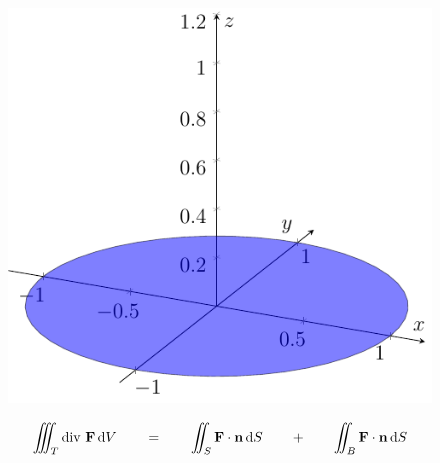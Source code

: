 \begin{frame}
\begin{figure}[ht]
\begin{minipage}[b]{0.30\linewidth}
        \end{minipage}
        \hspace{0.30cm}
        \begin{minipage}[b]{0.30\linewidth}
            \centering
            \includegraphics[width=\textwidth]{../img/2-Bunn.pdf}
        \end{minipage}
    \end{figure}
\begin{align*}
    \iiint_{T} \text{div }\mathbf{F} \mathop{}\! \mathrm{d} V\mathop{}\!
    \qquad =  \qquad
    \iint_{S} \mathbf{F} \cdot \mathbf{n} \mathop{}\! \mathrm{d} S\mathop{}\!
    \qquad + \qquad
    \iint_{B} \mathbf{F} \cdot \mathbf{n} \mathop{}\! \mathrm{d} S\mathop{}\!
\end{align*}
\end{frame}

